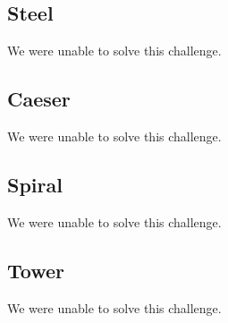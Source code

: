 \subsection{Steel}
We were unable to solve this challenge.

\subsection{Caeser}
We were unable to solve this challenge.

\subsection{Spiral}
We were unable to solve this challenge.

\subsection{Tower}
We were unable to solve this challenge.
